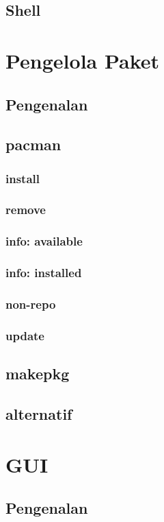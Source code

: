 \documentclass[12pt,]{article}
\begin{document}
	\subsection{Shell}
	
	\newpage
	\section{Pengelola Paket}
	\subsection{Pengenalan}
	\subsection{pacman}
	\subsubsection{install}
	\subsubsection{remove}
	\subsubsection{info: available}
	\subsubsection{info: installed}
	\subsubsection{non-repo}
	\subsubsection{update}
	\subsection{makepkg}
	\subsection{alternatif}
	
	\section{GUI}
	\subsection{Pengenalan}
\end{document}
